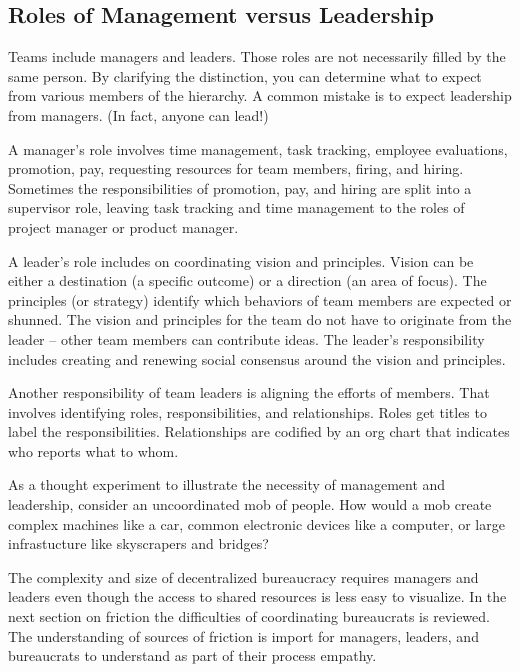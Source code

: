 

\subsection*{Roles of Management versus Leadership}

Teams include managers and leaders. Those roles are not necessarily filled by the same person. By clarifying the distinction, you can determine what to expect from various members of the hierarchy. A common mistake is to expect leadership from managers. (In fact, anyone can lead!)

A manager's role involves time management, task tracking, employee evaluations, promotion, pay, requesting resources for team members, firing, and hiring. Sometimes the responsibilities of promotion, pay, and hiring are split into a supervisor role, leaving task tracking and time management to the roles of project manager or product manager.

A leader's role includes on coordinating vision and principles. Vision can be either a destination (a specific outcome) or a direction (an area of focus). The principles (or strategy) identify which behaviors of team members are expected or shunned. The vision and principles for the team do not have to originate from the leader -- other team members can contribute ideas. The leader's responsibility includes creating and renewing social consensus around the vision and principles. 

Another responsibility of team leaders is aligning the efforts of members. That involves identifying roles, responsibilities, and relationships. Roles get titles to label the responsibilities. Relationships are codified by an \gls{org chart} that indicates who reports what to whom. 

As a thought experiment to illustrate the necessity of management and leadership, consider an uncoordinated mob of people. How would a mob create complex machines like a car, common electronic devices like a computer, or large infrastucture like skyscrapers and bridges?

The complexity and size of \gls{decentralized bureaucracy} requires managers and leaders even though the access to shared resources is less easy to visualize. In the next section on friction the difficulties of coordinating bureaucrats is reviewed. The understanding of sources of friction is import for managers, leaders, and bureaucrats to understand as part of their process empathy.


